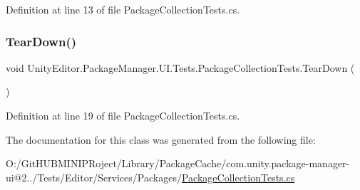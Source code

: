 Definition at line 13 of file Package\+Collection\+Tests.\+cs.

\mbox{\label{class_unity_editor_1_1_package_manager_1_1_u_i_1_1_tests_1_1_package_collection_tests_ab5dbc257b2e6d836808cb0e659f0f96a}} 
\subsubsection{\texorpdfstring{TearDown()}{TearDown()}}
{\footnotesize\ttfamily void Unity\+Editor.\+Package\+Manager.\+U\+I.\+Tests.\+Package\+Collection\+Tests.\+Tear\+Down (\begin{DoxyParamCaption}{ }\end{DoxyParamCaption})}



Definition at line 19 of file Package\+Collection\+Tests.\+cs.



The documentation for this class was generated from the following file\+:\begin{DoxyCompactItemize}
\item 
O\+:/\+Git\+H\+U\+B\+M\+I\+N\+I\+P\+Roject/\+Library/\+Package\+Cache/com.\+unity.\+package-\/manager-\/ui@2../\+Tests/\+Editor/\+Services/\+Packages/\mbox{\hyperlink{_package_collection_tests_8cs}{Package\+Collection\+Tests.\+cs}}\end{DoxyCompactItemize}
